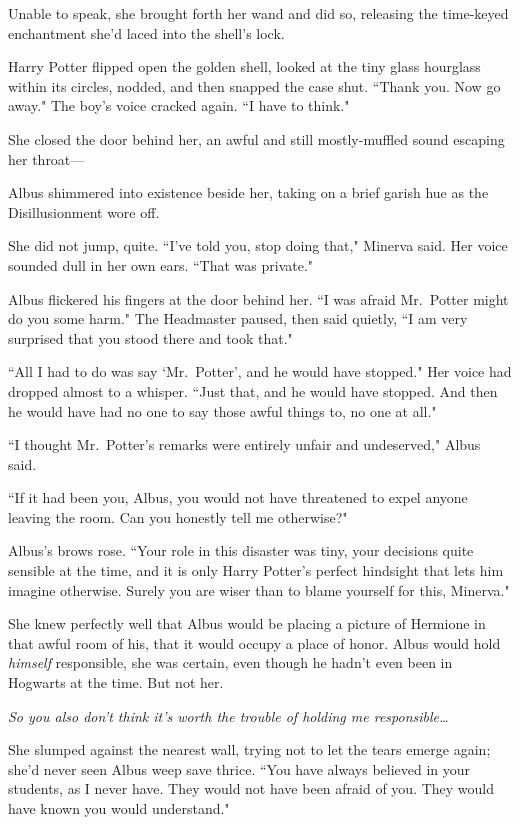 Unable to speak, she brought forth her wand and did so, releasing the time-keyed enchantment she'd laced into the shell's lock.

Harry Potter flipped open the golden shell, looked at the tiny glass hourglass within its circles, nodded, and then snapped the case shut. ``Thank you. Now go away." The boy's voice cracked again. ``I have to think."

\later

She closed the door behind her, an awful and still mostly-muffled sound escaping her throat---

Albus shimmered into existence beside her, taking on a brief garish hue as the Disillusionment wore off.

She did not jump, quite. ``I've told you, stop doing that," Minerva said. Her voice sounded dull in her own ears. ``That was private."

Albus flickered his fingers at the door behind her. ``I was afraid Mr.~Potter might do you some harm." The Headmaster paused, then said quietly, ``I am very surprised that you stood there and took that."

``All I had to do was say `Mr.~Potter', and he would have stopped." Her voice had dropped almost to a whisper. ``Just that, and he would have stopped. And then he would have had no one to say those awful things to, no one at all."

``I thought Mr.~Potter's remarks were entirely unfair and undeserved," Albus said.

``If it had been you, Albus, you would not have threatened to expel anyone leaving the room. Can you honestly tell me otherwise?"

Albus's brows rose. ``Your role in this disaster was tiny, your decisions quite sensible at the time, and it is only Harry Potter's perfect hindsight that lets him imagine otherwise. Surely you are wiser than to blame yourself for this, Minerva."

She knew perfectly well that Albus would be placing a picture of Hermione in that awful room of his, that it would occupy a place of honor. Albus would hold \emph{himself} responsible, she was certain, even though he hadn't even been in Hogwarts at the time. But not her.

\emph{So you also don't think it's worth the trouble of holding me responsible{\ldots}}

She slumped against the nearest wall, trying not to let the tears emerge again; she'd never seen Albus weep save thrice. ``You have always believed in your students, as I never have. They would not have been afraid of you. They would have known you would understand."

